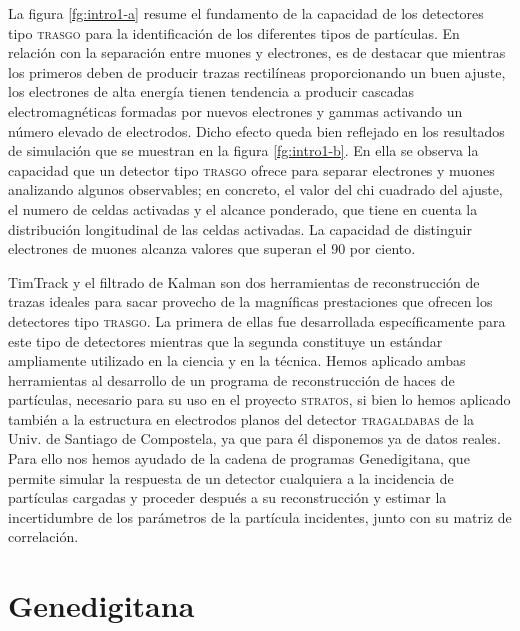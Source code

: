 \documentclass[a4paper]{article}
\begin{document}
La figura \ref{fg:intro1-a} resume el fundamento de la capacidad de los detectores tipo \textsc{trasgo} para la identificación de los diferentes tipos de partículas. En relación con la separación entre muones y electrones, es de destacar que mientras los primeros deben de producir trazas rectilíneas proporcionando un buen ajuste, los electrones de alta energía tienen tendencia a producir cascadas electromagnéticas formadas por nuevos electrones y gammas activando un número elevado de electrodos. Dicho efecto queda bien reflejado en los resultados de simulación que se muestran en la figura \ref{fg:intro1-b}. En ella se observa la capacidad que un detector tipo \textsc{trasgo} ofrece para separar electrones y muones analizando algunos observables; en concreto, el valor del chi cuadrado del ajuste, el numero de celdas activadas y el alcance ponderado, que tiene en cuenta la distribución longitudinal de las celdas activadas. La capacidad de distinguir electrones de muones alcanza valores que superan el 90 por ciento.

TimTrack \cite{ttrack} y el filtrado de Kalman \cite{joaneh} son dos herramientas de reconstrucción de trazas ideales para sacar provecho de la magníficas prestaciones que ofrecen los detectores tipo \textsc{trasgo}. La primera de ellas fue desarrollada específicamente para este tipo de detectores mientras que la segunda constituye un estándar ampliamente utilizado en la ciencia y en la técnica. Hemos aplicado ambas herramientas al desarrollo de un programa de reconstrucción de haces de partículas, necesario para su uso en el proyecto \textsc{stratos}, si bien lo hemos aplicado también a la estructura en electrodos planos del detector \textsc{tragaldabas} de la Univ. de Santiago de Compostela, ya que para él disponemos ya de datos reales. Para ello nos hemos ayudado de la cadena de programas Genedigitana, que permite simular la respuesta de un detector cualquiera a la incidencia de partículas cargadas y proceder después a su reconstrucción y estimar la incertidumbre de los parámetros de la partícula incidentes, junto con su matriz de correlación.



\section{Genedigitana}
\end{document}
